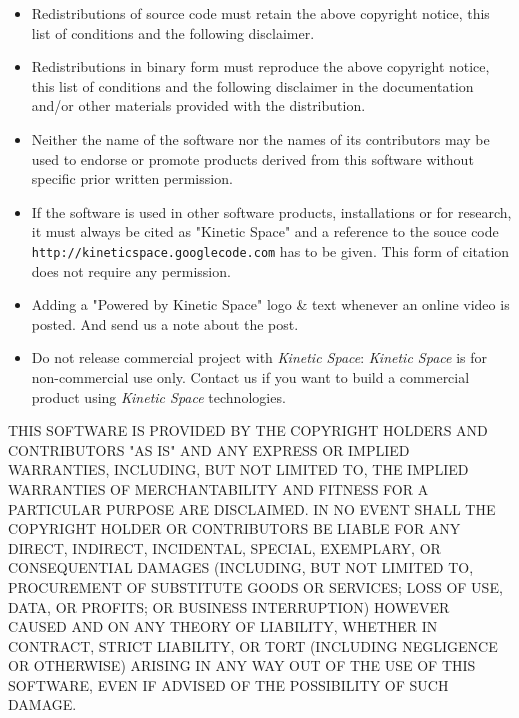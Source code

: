 \documentclass[titlepage,12pt,a4paper]{article}
\begin{document}
\begin{itemize}
	\item Redistributions of source code must retain the above copyright notice, 
      this list of conditions and the following disclaimer.
	\item Redistributions in binary form must reproduce the above copyright notice, 
      this list of conditions and the following disclaimer in the documentation 
      and/or other materials provided with the distribution.
	\item Neither the name of the software nor the names of its contributors
      may be used to endorse or promote products derived from this software 
      without specific prior written permission.
	\item If the software is used in other software products, installations or for
	  research, it must always be cited as "Kinetic Space" and a reference 
	  to the souce code \texttt{http://kineticspace.googlecode.com} has to be given.
	  This form of citation does not require any permission.
	\item Adding a "Powered by Kinetic Space" logo \& text whenever an online video is posted. And send us a note about the post.
	\item Do not release commercial project with \emph{Kinetic Space}: \emph{Kinetic Space} is for non-commercial use only. Contact us if you want to build a commercial product using \emph{Kinetic Space} technologies.
\end{itemize}

THIS SOFTWARE IS PROVIDED BY THE COPYRIGHT HOLDERS AND CONTRIBUTORS "AS IS"
AND ANY EXPRESS OR IMPLIED WARRANTIES, INCLUDING, BUT NOT LIMITED TO, THE 
IMPLIED WARRANTIES OF MERCHANTABILITY AND FITNESS FOR A PARTICULAR PURPOSE
ARE DISCLAIMED. IN NO EVENT SHALL THE COPYRIGHT HOLDER OR CONTRIBUTORS BE
LIABLE FOR ANY DIRECT, INDIRECT, INCIDENTAL, SPECIAL, EXEMPLARY, OR
CONSEQUENTIAL DAMAGES (INCLUDING, BUT NOT LIMITED TO, PROCUREMENT OF
SUBSTITUTE GOODS OR SERVICES; LOSS OF USE, DATA, OR PROFITS; OR BUSINESS
INTERRUPTION) HOWEVER CAUSED AND ON ANY THEORY OF LIABILITY, WHETHER IN
CONTRACT, STRICT LIABILITY, OR TORT (INCLUDING NEGLIGENCE OR OTHERWISE)
ARISING IN ANY WAY OUT OF THE USE OF THIS SOFTWARE, EVEN IF ADVISED OF THE
POSSIBILITY OF SUCH DAMAGE.

\newpage
\end{document}
